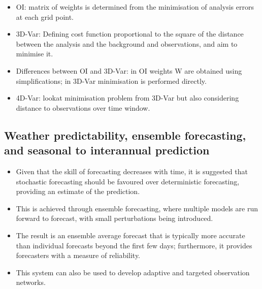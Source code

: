 \begin{itemize}
\begin{itemize}
        \item OI: matrix of weights is determined from the minimisation of analysis errors at each grid point.
        \item 3D-Var: Defining cost function proportional to the square of the distance between the analysis and the background and observations, and aim to minimise it.
        \item Differences between OI and 3D-Var: in OI weights W are obtained using simplifications; in 3D-Var minimisation is performed directly.
        \item 4D-Var: lookat minimisation problem from 3D-Var but also considering distance to observations over time window.
    \end{itemize}
\end{itemize}

\subsection{Weather predictability, ensemble forecasting, and seasonal to interannual prediction}
\label{sub:historical_overview:predictability}

\begin{itemize}
    \item Given that the skill of forecasting decreases with time, it is suggested that stochastic forecasting should be favoured over deterministic forecasting, providing an estimate of the prediction.
    \item This is achieved through ensemble forecasting, where multiple models are run forward to forecast, with small perturbations being introduced.
    \item The result is an ensemble average forecast that is typically more accurate than individual forecasts beyond the first few days; furthermore, it provides forecasters with a measure of reliability.
    \item This system can also be used to develop adaptive and targeted observation networks.
\end{itemize}



